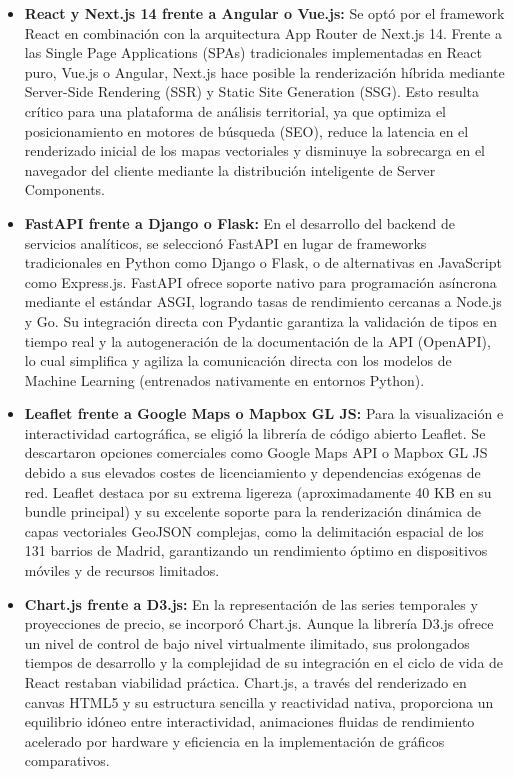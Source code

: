 \documentclass[a4paper,11pt,openany]{book}
\begin{document}
\begin{itemize}
    \item \textbf{React y Next.js 14 frente a Angular o Vue.js:} Se optó por el framework React en combinación con la arquitectura App Router de Next.js 14. Frente a las Single Page Applications (SPAs) tradicionales implementadas en React puro, Vue.js o Angular, Next.js hace posible la renderización híbrida mediante Server-Side Rendering (SSR) y Static Site Generation (SSG). Esto resulta crítico para una plataforma de análisis territorial, ya que optimiza el posicionamiento en motores de búsqueda (SEO), reduce la latencia en el renderizado inicial de los mapas vectoriales y disminuye la sobrecarga en el navegador del cliente mediante la distribución inteligente de Server Components.
    \item \textbf{FastAPI frente a Django o Flask:} En el desarrollo del backend de servicios analíticos, se seleccionó FastAPI en lugar de frameworks tradicionales en Python como Django o Flask, o de alternativas en JavaScript como Express.js. FastAPI ofrece soporte nativo para programación asíncrona mediante el estándar ASGI, logrando tasas de rendimiento cercanas a Node.js y Go. Su integración directa con Pydantic garantiza la validación de tipos en tiempo real y la autogeneración de la documentación de la API (OpenAPI), lo cual simplifica y agiliza la comunicación directa con los modelos de Machine Learning (entrenados nativamente en entornos Python).
    \item \textbf{Leaflet frente a Google Maps o Mapbox GL JS:} Para la visualización e interactividad cartográfica, se eligió la librería de código abierto Leaflet. Se descartaron opciones comerciales como Google Maps API o Mapbox GL JS debido a sus elevados costes de licenciamiento y dependencias exógenas de red. Leaflet destaca por su extrema ligereza (aproximadamente 40 KB en su bundle principal) y su excelente soporte para la renderización dinámica de capas vectoriales GeoJSON complejas, como la delimitación espacial de los 131 barrios de Madrid, garantizando un rendimiento óptimo en dispositivos móviles y de recursos limitados.
    \item \textbf{Chart.js frente a D3.js:} En la representación de las series temporales y proyecciones de precio, se incorporó Chart.js. Aunque la librería D3.js ofrece un nivel de control de bajo nivel virtualmente ilimitado, sus prolongados tiempos de desarrollo y la complejidad de su integración en el ciclo de vida de React restaban viabilidad práctica. Chart.js, a través del renderizado en canvas HTML5 y su estructura sencilla y reactividad nativa, proporciona un equilibrio idóneo entre interactividad, animaciones fluidas de rendimiento acelerado por hardware y eficiencia en la implementación de gráficos comparativos.
\end{itemize}
\end{document}
